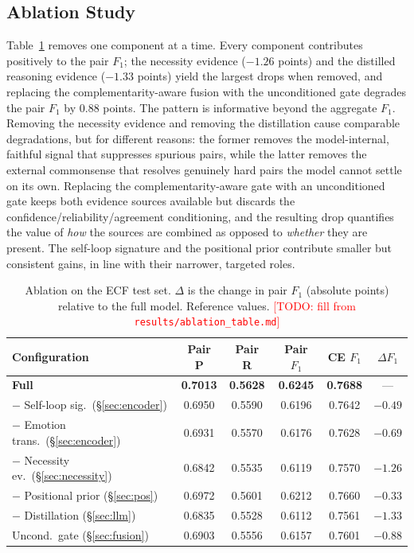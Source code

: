 \documentclass[journal]{IEEEtran}
\newcommand{\todo}[1]{\textcolor{red}{[TODO: #1]}}
\begin{document}
\subsection{Ablation Study}
Table~\ref{tab:ablation} removes one component at a time. Every component contributes
positively to the pair $F_1$; the necessity evidence ($-1.26$ points) and the distilled
reasoning evidence ($-1.33$ points) yield the largest drops when removed, and replacing the
complementarity-aware fusion with the unconditioned gate degrades the pair $F_1$ by $0.88$
points. %
The pattern is informative beyond the aggregate $F_1$. Removing the necessity evidence and
removing the distillation cause comparable degradations, but for different reasons: the former
removes the model-internal, faithful signal that suppresses spurious pairs, while the latter
removes the external commonsense that resolves genuinely hard pairs the model cannot settle on
its own. Replacing the complementarity-aware gate with an unconditioned gate keeps both
evidence sources available but discards the confidence/reliability/agreement conditioning, and
the resulting drop quantifies the value of \emph{how} the sources are combined as opposed to
\emph{whether} they are present. The self-loop signature and the positional prior contribute
smaller but consistent gains, in line with their narrower, targeted roles.
\begin{table}[t]
\centering
\caption{Ablation on the ECF test set. $\Delta$ is the change in pair $F_1$ (absolute points)
relative to the full model. Reference values. \todo{fill from
\texttt{results/ablation\_table.md}}}
\label{tab:ablation}
\setlength{\tabcolsep}{4pt}
\begin{tabular}{lccccc}
\toprule
Configuration & Pair P & Pair R & Pair $F_1$ & CE $F_1$ & $\Delta F_1$ \\
\midrule
\textbf{Full} & \textbf{0.7013} & \textbf{0.5628} & \textbf{0.6245} & \textbf{0.7688} & --- \\
$-$ Self-loop sig.\ (\S\ref{sec:encoder}) & 0.6950 & 0.5590 & 0.6196 & 0.7642 & $-0.49$ \\
$-$ Emotion trans.\ (\S\ref{sec:encoder}) & 0.6931 & 0.5570 & 0.6176 & 0.7628 & $-0.69$ \\
$-$ Necessity ev.\ (\S\ref{sec:necessity}) & 0.6842 & 0.5535 & 0.6119 & 0.7570 & $-1.26$ \\
$-$ Positional prior (\S\ref{sec:pos}) & 0.6972 & 0.5601 & 0.6212 & 0.7660 & $-0.33$ \\
$-$ Distillation (\S\ref{sec:llm}) & 0.6835 & 0.5528 & 0.6112 & 0.7561 & $-1.33$ \\
Uncond.\ gate (\S\ref{sec:fusion}) & 0.6903 & 0.5556 & 0.6157 & 0.7601 & $-0.88$ \\
\bottomrule
\end{tabular}
\end{table}
\end{document}
